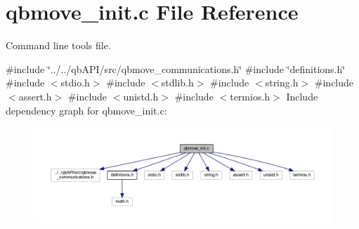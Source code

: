 \section{qbmove\+\_\+init.\+c File Reference}
\label{qbmove__init_8c}


Command line tools file.  


{\ttfamily \#include \char`\"{}../../qb\+A\+P\+I/src/qbmove\+\_\+communications.\+h\char`\"{}}\newline
{\ttfamily \#include \char`\"{}definitions.\+h\char`\"{}}\newline
{\ttfamily \#include $<$stdio.\+h$>$}\newline
{\ttfamily \#include $<$stdlib.\+h$>$}\newline
{\ttfamily \#include $<$string.\+h$>$}\newline
{\ttfamily \#include $<$assert.\+h$>$}\newline
{\ttfamily \#include $<$unistd.\+h$>$}\newline
{\ttfamily \#include $<$termios.\+h$>$}\newline
Include dependency graph for qbmove\+\_\+init.\+c\+:\nopagebreak
\begin{figure}[H]
\begin{center}
\leavevmode
\includegraphics[width=350pt]{qbmove__init_8c__incl}
\end{center}
\end{figure}
